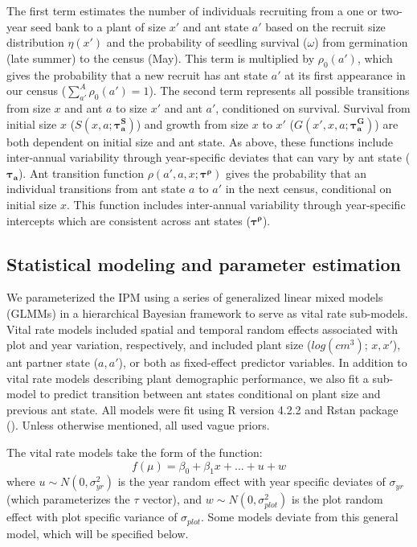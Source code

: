 \documentclass[11pt]{article}
\begin{document}
	\noindent The first term estimates the number of individuals recruiting from a one or two-year seed bank to a plant of size $x'$ and ant state $a'$ based on the recruit size distribution $\eta(x')$ and the probability of seedling survival ($\omega$) from germination (late summer) to the census (May).
	This term is multiplied by $\rho_{0}(a')$, which gives the probability that a new recruit has ant state $a'$ at its first appearance in our census ($\sum_{a'}^{A}\rho_{0}(a')=1$). 
	The second term represents all possible transitions from size $x$ and ant $a$ to size $x'$ and ant $a'$, conditioned on survival. 
	Survival from initial size $x$ ($S(x,a;\pmb{\tau^S_{a}})$) and growth from size $x$ to $x'$ ($G(x',x,a;\pmb{\tau^G_{a}})$) are both dependent on initial size and ant state. 
	As above, these functions include inter-annual variability through year-specific deviates that can vary by ant state ($\pmb{\tau_{a}}$). 
	Ant transition function $\rho(a',a,x;\pmb{\tau^{\rho}})$ gives the probability that an individual transitions from ant state $a$ to $a'$ in the next census, conditional on initial size $x$. 
	This function includes inter-annual variability through year-specific intercepts which are consistent across ant states ($\pmb{\tau^\rho}$).
	
	\subsection*{Statistical modeling and parameter estimation}
	We parameterized the IPM using a series of generalized linear mixed models (GLMMs) in a hierarchical Bayesian framework to serve as vital rate sub-models. 
	Vital rate models included spatial and temporal random effects associated with plot and year variation, respectively, and included plant size ($log(cm^3)$; $x,x'$), ant partner state ($a,a'$), or both as fixed-effect predictor variables. 
	In addition to vital rate models describing plant demographic performance, we also fit a sub-model to predict transition between ant states conditional on plant size and previous ant state. 
	All models were fit using R version 4.2.2 and Rstan package (\cite{Rstancite, Rcite}).
	Unless otherwise mentioned, all used vague priors. 
	
	The vital rate models take the form of the function:
	$$ f(\mu) = \beta_0 + \beta_1 x + ... + u + w $$
	\noindent where $u \sim N(0,\sigma_{yr }^{2})$ is the year random effect with year specific deviates of $\sigma_{yr}$ (which parameterizes the $\tau$ vector), and $w \sim N(0,\sigma_{plot}^{2})$ is the plot random effect with plot specific variance of $\sigma_{plot}$. 
	Some models deviate from this general model, which will be specified below.
	
\end{document}

